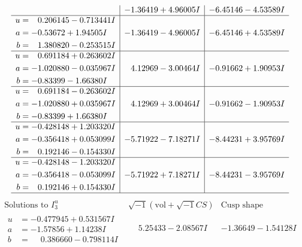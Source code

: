 \documentclass[1p]{elsarticle_modified}
\theoremstyle{definition}
\newcommand{\I}{\sqrt{-1}}
\begin{document}
$$\begin{array}{c|c|c}
 & -1.36419 + 4.96005 I & -6.45146 - 4.53589 I \\ \hline\begin{aligned}
u &= \phantom{-}0.206145 - 0.713441 I \\
a &= -0.53672 + 1.94505 I \\
b &= \phantom{-}1.380820 - 0.253515 I\end{aligned}
 & -1.36419 - 4.96005 I & -6.45146 + 4.53589 I \\ \hline\begin{aligned}
u &= \phantom{-}0.691184 + 0.263602 I \\
a &= -1.020880 - 0.035967 I \\
b &= -0.83399 - 1.66380 I\end{aligned}
 & \phantom{-}4.12969 - 3.00464 I & -0.91662 + 1.90953 I \\ \hline\begin{aligned}
u &= \phantom{-}0.691184 - 0.263602 I \\
a &= -1.020880 + 0.035967 I \\
b &= -0.83399 + 1.66380 I\end{aligned}
 & \phantom{-}4.12969 + 3.00464 I & -0.91662 - 1.90953 I \\ \hline\begin{aligned}
u &= -0.428148 + 1.203320 I \\
a &= -0.356418 + 0.053099 I \\
b &= \phantom{-}0.192146 - 0.154330 I\end{aligned}
 & -5.71922 - 7.18271 I & -8.44231 + 3.95769 I \\ \hline\begin{aligned}
u &= -0.428148 - 1.203320 I \\
a &= -0.356418 - 0.053099 I \\
b &= \phantom{-}0.192146 + 0.154330 I\end{aligned}
 & -5.71922 + 7.18271 I & -8.44231 - 3.95769 I\\
 \hline 
 \end{array}$$\newpage$$\begin{array}{c|c|c}  
\text{Solutions to }I^u_{3}& \I (\text{vol} + \sqrt{-1}CS) & \text{Cusp shape}\\
 \hline 
\begin{aligned}
u &= -0.477945 + 0.531567 I \\
a &= -1.57856 + 1.14238 I \\
b &= \phantom{-}0.386660 - 0.798114 I\end{aligned}
 & \phantom{-}5.25433 - 2.08567 I & -1.36649 - 1.54128 I \\ \hline\begin{aligned}

\end{aligned}
\end{array}$$
\end{document}
